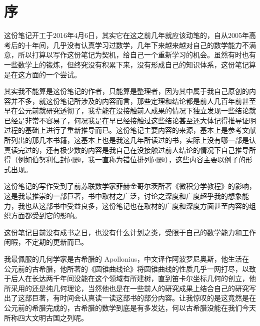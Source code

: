 
\chapter*{序}

这份笔记开工于2016年4月6日，其实它在这之前几年就应该动笔的，自从2005年高考后的十年间，几乎没有认真学习过数学，几年下来越来越对自己的数学能力不满意，所以打算以写作这份笔记为契机，给自己一个重新学习的机会。虽然有时也有一些数学上的锻炼，但终究没有积累下来，没有形成自己的知识体系，这份笔记算是在这方面的一个尝试。

其实我不能算是这份笔记的作者，只能算是整理者，因为其中属于我自己原创的内容并不多，就这份笔记所涉及的内容而言，那些定理和结论都是前人几百年前甚至早在公元前就研究透彻了，我辈能在没接触前人成果的情况下独立发现一些结论就已经是非常不容易了，何况我是在早已经接触过这些结论甚至还大体记得推导证明过程的基础上进行了重新推导而已。这份笔记主要内容的来源，基本上是参考文献所列出的那几本书籍，这基本上也是我这几年所读过的书，实际上没有哪一部是认真读完过的，还有极少数的内容是我自己在没接触过前人结论的情况下自己推导所得（例如伯努利信封问题，我一直称为错位排列问题），这些内容主要以例子的形式出现。

这份笔记的写作受到了前苏联数学家菲赫金哥尔茨所著《微积分学教程》的影响，这是我最推崇的一部巨著，书中取材之广泛，讨论之深度和广度超乎我的想象能力，我也从这部书中受益良多，这份笔记也在取材的广度和深度方面甚至内容的组织方面都受到它的影响。

这份笔记目前没有成书之日，也没有什么计划之类，受限于自己的数学能力和工作闲暇，不定期的更新而已。

我最佩服的几何学家是古希腊的 Apollonius，中文译作阿波罗尼奥斯，他生活在公元前的古希腊，他所著的《圆锥曲线论》将圆锥曲线的性质几乎一网打尽，以致于后人在长达两千年间没能在这个领域有所建树，直到笛卡尔坐标几何的创立，他所采用的还是纯几何理论，当然他也是在一些前人的研究成果上结合自己的研究写出了这部巨著，有时间会认真读一读这部书的部分内容。让我惊叹的是这竟然是在公元前的希腊完成的，古希腊的数学到底是有多发达，何以古希腊没能在我们今天所称四大文明古国之列呢。

